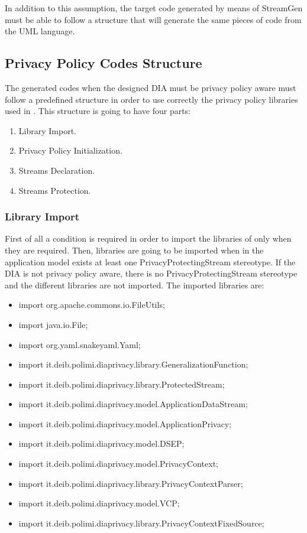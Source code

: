 In addition to this assumption, the target code generated by means of StreamGen must be able to follow a structure that will generate the same pieces of code from the UML language.

\subsection{Privacy Policy Codes Structure}

The generated codes when the designed DIA must be privacy policy aware must follow a predefined structure in order to use correctly the privacy policy libraries used in \cite{privacypoliciesarticle}. This structure is going to have four parts:

\begin{enumerate}
\item Library Import.
\item Privacy Policy Initialization.
\item Streams Declaration.
\item Streams Protection.
\end{enumerate}

\subsubsection{Library Import}

First of all  a condition is required in order to import the libraries of \cite{privacypoliciesarticle} only when they are required. Then, libraries are going to be imported when in the application model exists at least one PrivacyProtectingStream stereotype. If the DIA is not privacy policy aware, there is no PrivacyProtectingStream stereotype and the different libraries are not imported. The imported libraries are:

\begin{itemize}
\item import org.apache.commons.io.FileUtils;
\item import java.io.File;
\item import org.yaml.snakeyaml.Yaml;
\item import it.deib.polimi.diaprivacy.library.GeneralizationFunction;
\item import it.deib.polimi.diaprivacy.library.ProtectedStream;
\item import it.deib.polimi.diaprivacy.model.ApplicationDataStream;
\item import it.deib.polimi.diaprivacy.model.ApplicationPrivacy;
\item import it.deib.polimi.diaprivacy.model.DSEP;
\item import it.deib.polimi.diaprivacy.model.PrivacyContext;
\item import it.deib.polimi.diaprivacy.library.PrivacyContextParser;
\item import it.deib.polimi.diaprivacy.model.VCP;
\item import it.deib.polimi.diaprivacy.library.PrivacyContextFixedSource;
\end{itemize}

